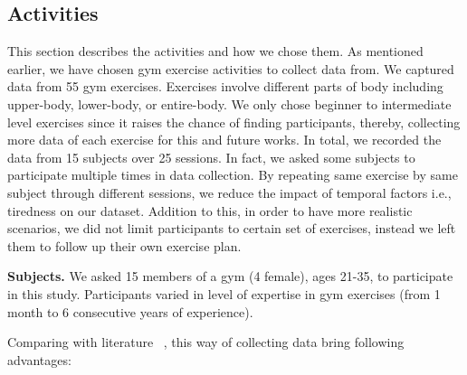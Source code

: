 \documentclass[journal,article,submit,moreauthors,pdftex]{Definitions/mdpi}
\begin{document}
\subsection{Activities}
This section describes the activities and how we chose them. As mentioned earlier, we have chosen gym exercise activities to collect data from.
We captured data from 55 gym exercises. Exercises involve different parts of body including upper-body, lower-body, or entire-body. We only chose beginner to intermediate level exercises since it raises the chance of finding participants, thereby, collecting more data of each exercise for this and future works. 
In total, we recorded the data from 15 subjects over 25 sessions. In fact, we asked some subjects to participate multiple times in data collection. By repeating same exercise by same subject through different sessions, we reduce the impact of temporal factors i.e., tiredness on our dataset.
Addition to this, in order to have more realistic scenarios, we did not limit participants to certain set of exercises, instead we left them to follow up their own exercise plan.

\noindent \textbf{Subjects.} We asked 15 members of a gym (4 female), ages 21-35, to participate in this study. Participants varied in level of expertise in gym exercises (from 1 month to 6 consecutive years of experience). 

Comparing with literature ~\cite{morris2014recofit, soro2019recognition, s140610146, anguita2013public}, this way of collecting data bring following advantages:
\end{document}
